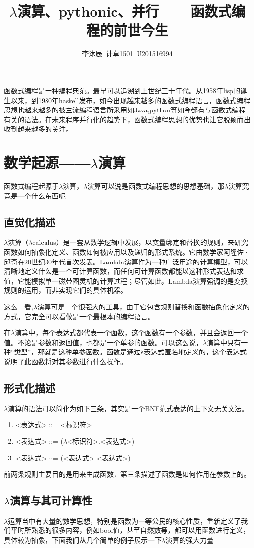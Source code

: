 \documentclass{article}
\author{李沐辰\ 计卓1501\ U201516994}
\title{$\lambda$演算、pythonic、并行——函数式编程的前世今生}
\date{}
\begin{document}
	\maketitle
	函数式编程是一种编程典范。最早可以追溯到上世纪三十年代。从1958年lisp的诞生以来，到1980年haskell发布，如今出现越来越多的函数式编程语言，函数式编程思想也越来越多的被主流编程语言所采用如Java,python等如今都有与函数式编程有关的语法。在未来程序并行化的趋势下，函数式编程思想的优势也让它脱颖而出收到越来越多的关注。
	\section{数学起源——$\lambda$演算}
	函数式编程起源于$\lambda$演算，$\lambda$演算可以说是函数式编程思想的思想基础，那$\lambda$演算究竟是一个什么东西呢
	\subsection{直觉化描述}
	$\lambda$演算（$\lambda$calculus）是一套从数学逻辑中发展，以变量绑定和替换的规则，来研究函数如何抽象化定义、函数如何被应用以及递归的形式系统。它由数学家阿隆佐·邱奇在20世纪30年代首次发表。Lambda演算作为一种广泛用途的计算模型，可以清晰地定义什么是一个可计算函数，而任何可计算函数都能以这种形式表达和求值，它能模拟单一磁带图灵机的计算过程；尽管如此，Lambda演算强调的是变换规则的运用，而非实现它们的具体机器。
	
	这么一看,$\lambda$演算可是一个很强大的工具，由于它包含规则替换和函数抽象化定义的方式，它完全可以看做是一个最根本的编程语言。
	
	在$\lambda$演算中，每个表达式都代表一个函数，这个函数有一个参数，并且会返回一个值。不论是参数和返回值，也都是一个单参的函数。可以这么说，$\lambda$演算中只有一种“类型”，那就是这种单参函数。函数是通过λ表达式匿名地定义的，这个表达式说明了此函数将对其参数进行什么操作。
	\subsection{形式化描述}
	$\lambda$演算的语法可以简化为如下三条，其实是一个BNF范式表达的上下文无关文法。
	\begin{enumerate}
	\item <表达式> ::= <标识符>
	\item <表达式> ::= ($\lambda$<标识符>.<表达式>)
	\item <表达式> ::= (<表达式> <表达式>)
	\end{enumerate}
	前两条规则主要目的是用来生成函数，第三条描述了函数是如何作用在参数上的。
	\subsection{$\lambda$演算与其可计算性}
	$\lambda$运算当中有大量的数学思想，特别是函数为一等公民的核心性质，重新定义了我们平时所熟悉的很多内容，例如bool值，甚至自然数等，都可以用函数进行定义，具体较为抽象，下面我们从几个简单的例子展示一下$\lambda$演算的强大力量
	
\end{document}
